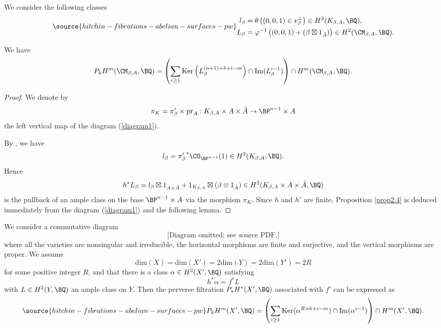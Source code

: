 We consider the following classes
\begin{equation}\label{Lbeta}
\source{hitchin-fibrations-abelian-surfaces-pw}
\begin{split}
    l_\beta & = \theta\left((0,0,1)\in v_\beta^\perp\right) \in H^2(K_{\beta,A} ,\BQ), \\
    L_\beta & = \varphi^{-1} \left( (0,0,1) +  (\beta\boxtimes 1_{\hat{A}}) \right) \in H^2(\CM_{\beta, A}, \BQ).
\end{split}
\end{equation}

\begin{prop}
\notready\label{prop2.4}
We have
\[
P_kH^m(\CM_{\beta,A}, \BQ) = \left(\sum_{i\geq 1} \mathrm{Ker}\left(L_\beta^{(n+1)+k+i-m}\right) \cap \mathrm{Im}(L_\beta^{i-1}) \right) \cap H^m(\CM_{\beta,A}, \BQ).
\]
\end{prop}

\begin{proof}
We denote by
\[
\pi_K = \pi'_\beta \times \mathrm{pr}_A : K_{\beta, A} \times A \times \hat{A} \to \BP^{n-1}\times A
\]
the left vertical map of the diagram (\ref{diagram1}).

By \cite[Example 3.1]{Markman4}, we have
\[
l_\beta = {\pi'_\beta}^\ast \CO_{\BP^{n-1}}(1) \in H^2(K_{\beta,A}, \BQ).
\]
Hence
\[
h^*L_\beta = l_\beta \boxtimes 1_{A\times\hat{A}}+ 1_{K_{\beta,A}}\boxtimes (\beta\otimes 1_{\hat{A}}) \in H^2(K_{\beta, A} \times A \times \hat{A},\BQ)
\]
is the pullback of an ample class on the base $\BP^{n-1}\times A$ via the morphism $\pi_K$. Since $h$ and $h'$ are finite, Proposition \ref{prop2.4} is deduced immediately from the diagram (\ref{diagram1}) and the following lemma.
\end{proof}

\begin{lem}
\notready
We consider a commutative diagram
\begin{equation*}
    \text{[Diagram omitted; see source PDF.]}
\end{equation*}
where all the varieties are nonsingular and irreducible, the horizontal morphisms are finite and surjective, and the vertical morphisms are proper. We assume
\[
\mathrm{dim}(X) = \mathrm{dim}(X') = 2 \mathrm{dim}(Y) = 2\mathrm{dim}(Y') =2R
\]
for some positive integer $R$, and that there is a class $\alpha \in H^2(X', \BQ)$ satisfying
\[
h^* \alpha = f^* L
\]
with $L \in H^2(Y, \BQ)$ an ample class on $Y$. Then the perverse filtration $P_\star H^*(X', \BQ)$ associated with $f'$ can be expressed as
\begin{equation}\label{2019}
\source{hitchin-fibrations-abelian-surfaces-pw}
P_kH^m(X', \BQ) = \left(\sum_{i\geq 1} \mathrm{Ker}(\alpha^{R+k+i-m}) \cap \mathrm{Im}(\alpha^{i-1}) \right) \cap H^m(X', \BQ).
\end{equation}
\end{lem}

